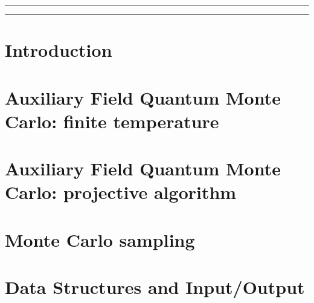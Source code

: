 \documentclass[submission, Phys]{SciPost}
\begin{document}


\vspace{10pt}
\noindent\rule{\textwidth}{1pt}
\tableofcontents\thispagestyle{fancy}
\noindent\rule{\textwidth}{1pt}
\vspace{10pt}

\section{Introduction}\label{sec:intro}

\section{Auxiliary Field Quantum Monte Carlo: finite temperature}\label{sec:def}




\section{Auxiliary Field Quantum Monte Carlo: projective algorithm}\label{sec:defT0}

\section{Monte Carlo sampling}\label{sec:sampling}

\section{Data Structures and Input/Output}\label{sec:imp}


\end{document}
